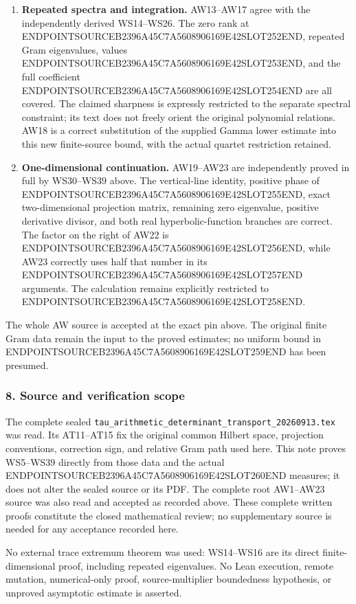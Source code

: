 \begin{enumerate}
\item
  \textbf{Repeated spectra and integration.} AW13--AW17 agree with the independently derived WS14--WS26. The zero rank at ENDPOINTSOURCEB2396A45C7A5608906169E42SLOT252END, repeated Gram eigenvalues, values ENDPOINTSOURCEB2396A45C7A5608906169E42SLOT253END, and the full coefficient ENDPOINTSOURCEB2396A45C7A5608906169E42SLOT254END are all covered. The claimed sharpness is expressly restricted to the separate spectral constraint; its text does not freely orient the original polynomial relations. AW18 is a correct substitution of the supplied Gamma lower estimate into this new finite-source bound, with the actual quartet restriction retained.
\item
  \textbf{One-dimensional continuation.} AW19--AW23 are independently proved in full by WS30--WS39 above. The vertical-line identity, positive phase of ENDPOINTSOURCEB2396A45C7A5608906169E42SLOT255END, exact two-dimensional projection matrix, remaining zero eigenvalue, positive derivative divisor, and both real hyperbolic-function branches are correct. The factor on the right of AW22 is ENDPOINTSOURCEB2396A45C7A5608906169E42SLOT256END, while AW23 correctly uses half that number in its ENDPOINTSOURCEB2396A45C7A5608906169E42SLOT257END arguments. The calculation remains explicitly restricted to ENDPOINTSOURCEB2396A45C7A5608906169E42SLOT258END.
\end{enumerate}

The whole AW source is accepted at the exact pin above. The original finite Gram data remain the input to the proved estimates; no uniform bound in ENDPOINTSOURCEB2396A45C7A5608906169E42SLOT259END has been presumed.

\subsubsection{8. Source and verification scope}\label{endpoint-window_review--source-and-verification-scope}

The complete sealed \texttt{tau\_arithmetic\_determinant\_transport\_20260913.tex} was read. Its AT11--AT15 fix the original common Hilbert space, projection conventions, correction sign, and relative Gram path used here. This note proves WS5--WS39 directly from those data and the actual ENDPOINTSOURCEB2396A45C7A5608906169E42SLOT260END measures; it does not alter the sealed source or its PDF. The complete root AW1--AW23 source was also read and accepted as recorded above. These complete written proofs constitute the closed mathematical review; no supplementary source is needed for any acceptance recorded here.

No external trace extremum theorem was used: WS14--WS16 are its direct finite-dimensional proof, including repeated eigenvalues. No Lean execution, remote mutation, numerical-only proof, source-multiplier boundedness hypothesis, or unproved asymptotic estimate is asserted.
